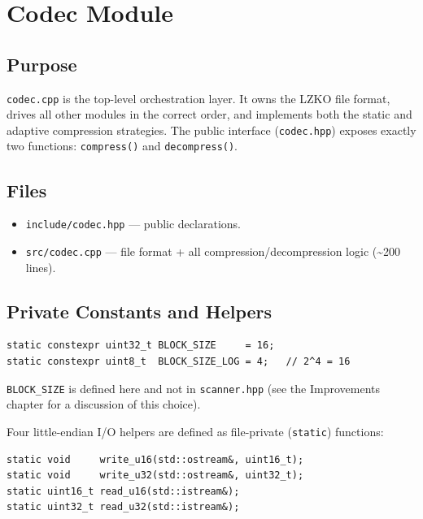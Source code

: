 \section{Codec Module}
\label{sec:codec}

\subsection{Purpose}

\texttt{codec.cpp} is the top-level orchestration layer.
It owns the LZKO file format, drives all other modules in the correct order, and
implements both the static and adaptive compression strategies.
The public interface (\texttt{codec.hpp}) exposes exactly two functions:
\texttt{compress()} and \texttt{decompress()}.

\subsection{Files}

\begin{itemize}
  \item \texttt{include/codec.hpp} --- public declarations.
  \item \texttt{src/codec.cpp} --- file format + all compression/decompression logic
        (\textasciitilde{}200 lines).
\end{itemize}

\subsection{Private Constants and Helpers}

\begin{lstlisting}[style=cpp]
static constexpr uint32_t BLOCK_SIZE     = 16;
static constexpr uint8_t  BLOCK_SIZE_LOG = 4;   // 2^4 = 16
\end{lstlisting}

\texttt{BLOCK\_SIZE} is defined here and not in \texttt{scanner.hpp} (see the Improvements
chapter for a discussion of this choice).

Four little-endian I/O helpers are defined as file-private (\texttt{static}) functions:

\begin{lstlisting}[style=cpp]
static void     write_u16(std::ostream&, uint16_t);
static void     write_u32(std::ostream&, uint32_t);
static uint16_t read_u16(std::istream&);
static uint32_t read_u32(std::istream&);
\end{lstlisting}

